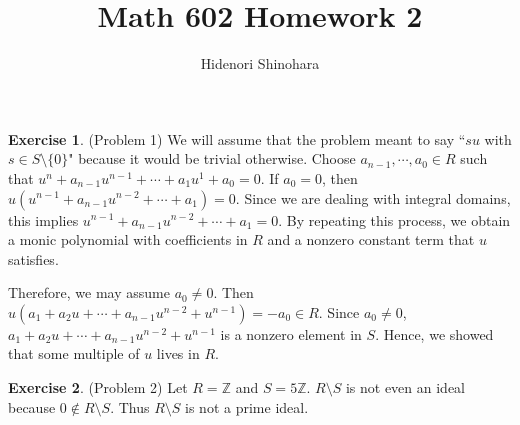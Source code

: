 \documentclass[12pt, psamsfonts]{amsart}
\theoremstyle{definition}
\newtheorem*{exer}{Exercise}
\theoremstyle{remark}
\numberwithin{equation}{section}
\begin{document}
\title{Math 602 Homework 2}
\author{Hidenori Shinohara}
\maketitle

\begin{exer}{(Problem 1)}
  We will assume that the problem meant to say ``$su$ with $s \in S \setminus \{ 0 \}$" because it would be trivial otherwise.
  Choose $a_{n - 1}, \cdots, a_0 \in R$ such that $u^n + a_{n - 1}u^{n - 1} + \cdots + a_1u^1 + a_0 = 0$.
  If $a_0 = 0$, then $u(u^{n - 1} + a_{n - 1}u^{n - 2} + \cdots + a_1) = 0$.
  Since we are dealing with integral domains, this implies $u^{n - 1} + a_{n - 1}u^{n - 2} + \cdots + a_1 = 0$.
  By repeating this process, we obtain a monic polynomial with coefficients in $R$ and a nonzero constant term that $u$ satisfies.

  Therefore, we may assume $a_0 \ne 0$.
  Then $u(a_1 + a_2u + \cdots + a_{n - 1}u^{n - 2} + u^{n - 1}) = -a_0 \in R$.
  Since $a_0 \ne 0$, $a_1 + a_2u + \cdots + a_{n - 1}u^{n - 2} + u^{n - 1}$ is a nonzero element in $S$.
  Hence, we showed that some multiple of $u$ lives in $R$.
\end{exer}

\begin{exer}{(Problem 2)}
  Let $R = \mathbb{Z}$ and $S = 5\mathbb{Z}$.
  $R \setminus S$ is not even an ideal because $0 \notin R \setminus S$.
  Thus $R \setminus S$ is not a prime ideal.
\end{exer}
\end{document}
